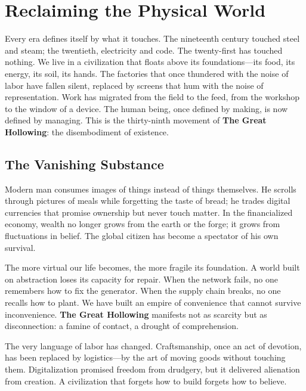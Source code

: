 \documentclass[11pt,twoside]{book}
\begin{document}
\chapter{Reclaiming the Physical World}
\label{ch:40}

Every era defines itself by what it touches.  
The nineteenth century touched steel and steam; the twentieth, electricity and code.  
The twenty-first has touched nothing.  
We live in a civilization that floats above its foundations—its food, its energy, its soil, its hands.  
The factories that once thundered with the noise of labor have fallen silent, replaced by screens that hum with the noise of representation.  
Work has migrated from the field to the feed, from the workshop to the window of a device.  
The human being, once defined by making, is now defined by managing.  
This is the thirty-ninth movement of \textbf{The Great Hollowing}: the disembodiment of existence.
\section*{The Vanishing Substance}

Modern man consumes images of things instead of things themselves.  
He scrolls through pictures of meals while forgetting the taste of bread; he trades digital currencies that promise ownership but never touch matter.  
In the financialized economy, wealth no longer grows from the earth or the forge; it grows from fluctuations in belief.  
The global citizen has become a spectator of his own survival.

The more virtual our life becomes, the more fragile its foundation.  
A world built on abstraction loses its capacity for repair.  
When the network fails, no one remembers how to fix the generator.  
When the supply chain breaks, no one recalls how to plant.  
We have built an empire of convenience that cannot survive inconvenience.  
\textbf{The Great Hollowing} manifests not as scarcity but as disconnection: a famine of contact, a drought of comprehension.

The very language of labor has changed.  
Craftsmanship, once an act of devotion, has been replaced by logistics—by the art of moving goods without touching them.  
Digitalization promised freedom from drudgery, but it delivered alienation from creation.  
A civilization that forgets how to build forgets how to believe.
\end{document}
